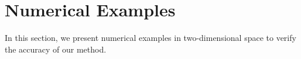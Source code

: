\documentclass[preprint,12pt]{elsarticle}
\theoremstyle{definition}
\theoremstyle{remark}
\begin{document}

\section{Numerical Examples}
In this section, we present numerical examples in two-dimensional space to verify the accuracy of our method.
\end{document}

